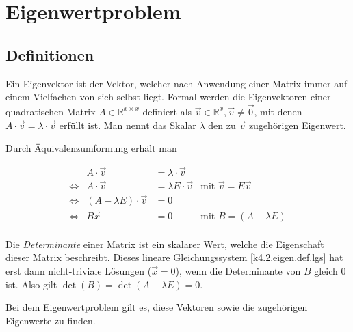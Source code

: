 \documentclass[]{dsadokumentation}
\begin{document}
\tableofcontents


\section{Eigenwertproblem}

\subsection{Definitionen}\label{k4.2.eigen.def}

Ein Eigenvektor ist der Vektor, welcher nach Anwendung einer Matrix immer auf einem Vielfachen von sich selbst liegt.
Formal werden die Eigenvektoren einer quadratischen Matrix $A \in \mathbb{R}^{x \times x}$ definiert als $\vec{v} \in \mathbb{R}^{x}, \vec{v} \neq \vec{0}$, mit denen $A \cdot \vec{v} = \lambda \cdot \vec{v}$ erfüllt ist. Man nennt das Skalar $\lambda$ den zu $\vec{v}$ zugehörigen Eigenwert.

Durch Äquivalenzumformung erhält man

\begin{equation}
  \label{k4.2.eigen.def.lgs}
  \begin{aligned}
     &                 & A \cdot \vec{v}               & = \lambda \cdot \vec{v}   &                                 & \\
     & \Leftrightarrow & A \cdot \vec{v}               & = \lambda E \cdot \vec{v} & \text{mit } \vec{v} = E\vec{v}  & \\
     & \Leftrightarrow & (A - \lambda E) \cdot \vec{v} & = 0                       &                                 & \\
     & \Leftrightarrow & B\vec{x}                      & = 0  \quad \quad          & \text{mit } B = (A - \lambda E) & \\
  \end{aligned}
\end{equation}

Die \textit{Determinante} einer Matrix ist ein skalarer Wert, welche die Eigenschaft dieser Matrix beschreibt. Dieses lineare Gleichungssystem \cref{k4.2.eigen.def.lgs} hat erst dann nicht-triviale Lösungen ($\vec{x} = 0$), wenn die Determinante von $B$ gleich $0$ ist. Also gilt $\det (B) = \det (A - \lambda E) = 0$.

Bei dem Eigenwertproblem gilt es, diese Vektoren sowie die zugehörigen Eigenwerte zu finden.
\end{document}

